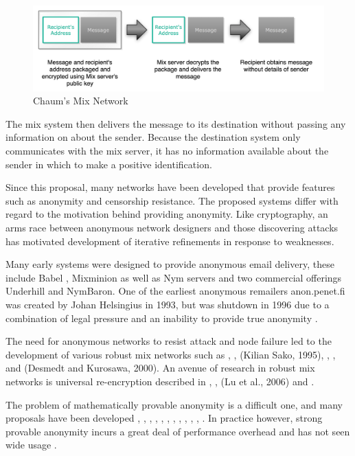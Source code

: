 \documentclass{ecuthesis}
\begin{document}
\begin{figure}[H]
\center \includegraphics[width=\linewidth]{chaums-mix-network}
\caption{Chaum's Mix Network}
\label{chaums-mix-network}
\end{figure}

The mix system then delivers the message to its destination without passing any information on about the sender. Because the destination system only communicates with the mix server, it has no information available about the sender in which to make a positive identification.

Since this proposal, many networks have been developed that provide features such as anonymity and censorship resistance. The proposed systems differ with regard to the motivation behind providing anonymity. Like cryptography, an arms race between anonymous network designers and those discovering attacks has motivated development of iterative refinements in response to weaknesses.

Many early systems were designed to provide anonymous email delivery, these include Babel \citep{Gulcu:1996p1662}, Mixminion \citep{Danezis:2003p1616} as well as Nym servers \citep{Mazieres:1998p4560} and two commercial offerings Underhill and NymBaron. One of the earliest anonymous remailers anon.penet.fi was created by Johan Helsingius in 1993, but was shutdown in 1996 due to a combination of legal pressure and an inability to provide true anonymity \cite{Danezis:2008p346}.

The need for anonymous networks to resist attack and node failure led to the development of various robust mix networks such as \citep{Waidner:1989p5870}, \citep{Park:1994p5051}, (Kilian  Sako, 1995), \citep{Ogata:1997p5083}, \citep{Abe:1998p1898}, \citep{Jakobsson:1998p5137} and (Desmedt and Kurosawa, 2000).  An avenue of research in robust mix networks is universal re-encryption described in \citep{Fairbrother:2005p5357}, \citep{Lu:2005p5387}, (Lu et al., 2006) and \citep{Gomukiewicz:2004p294}.

The problem of mathematically provable anonymity is a difficult one, and many proposals have been developed \citep{Chaum:1988p5869}, \citep{Rackoff:1993p5817}, \citep{Kesdogan:1998p2027}, \citep{Jakobsson:1999p2008} \cite{Neff:2001p2068}, \cite{Furukawa:2001p5158}, \citep{Golle:2004p5204}, \citep{Gomukiewicz:2003p5816}, \citep{Berman:2004p303}, \citep{Golle:2004p5204}, \citep{Adida:2007p5205}, \citep{Klonowski:2005p5379}, \citep{Nguyen:2008p3837}. In practice however, strong provable anonymity incurs a great deal of performance overhead and has not seen wide usage \citep{Danezis:2008p346}.
\end{document}
